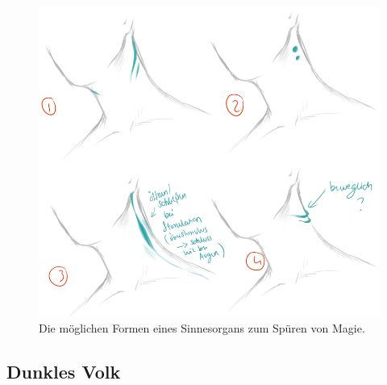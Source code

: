 \begin{figure}
	\centering
	\includegraphics[width=0.7\linewidth]{Abbildungen/Weltenbau/Lebensformen/Sinnesorgan_Auswahl}
	\caption{Die möglichen Formen eines Sinnesorgans zum Spüren von Magie.}
	\label{fig:sinnesorganauswahl}
\end{figure}

\subsection{Dunkles Volk}

